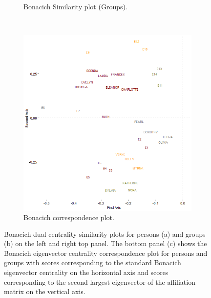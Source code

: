 \documentclass[a4paper,fleqn]{cas-sc}
\begin{document}
\begin{figure}
\begin{subfigure}[b]{0.4\textwidth}
            \caption{Bonacich Similarity plot (Groups).}
            \label{fig:g-bon-sim}
    \end{subfigure} \\
     \begin{subfigure}[b]{0.65\textwidth}
        \includegraphics[width=1.0\textwidth]{Plots/bon-corr-plot.png}
            \caption{Bonacich correspondence plot.}
            \label{fig:bon-corr}
    \end{subfigure}
    \caption{Bonacich dual centrality similarity plots for persons (a) and groups (b) on the left and right top panel. The bottom panel (c) shows the Bonacich eigenvector centrality correspondence plot for persons and groups with scores corresponding to the standard Bonacich eigenvector centrality on the horizontal axis and scores corresponding to the second largest eigenvector of the affiliation matrix on the vertical axis.}
    \label{fig:bon-sim}
\end{figure}
\end{document}
